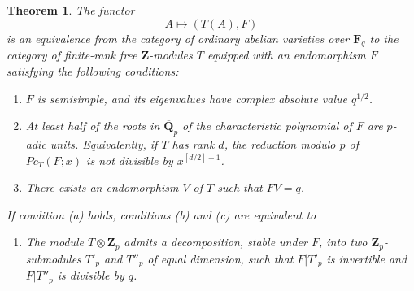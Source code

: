 \documentclass[10pt]{amsart}
\theoremstyle{plain}
\newtheorem{theorem}{Theorem}
\theoremstyle{remark}
\begin{document}
\begin{theorem}
The functor
\[
A\longmapsto (T(A),F)
\]
is an equivalence from the category of ordinary abelian varieties over $\mathbf F_q$ to the category of finite-rank free $\mathbf Z$-modules $T$ equipped with an endomorphism $F$ satisfying the following conditions:
\begin{enumerate}
\item[(a)] $F$ is semisimple, and its eigenvalues have complex absolute value $q^{1/2}$.
\item[(b)] At least half of the roots in $\overline{\mathbf Q}_p$ of the characteristic polynomial of $F$ are $p$-adic units. Equivalently, if $T$ has rank $d$, the reduction modulo $p$ of $Pc_T(F;x)$ is not divisible by $x^{[d/2]+1}$.
\item[(c)] There exists an endomorphism $V$ of $T$ such that $FV=q$.
\end{enumerate}
If condition (a) holds, conditions (b) and (c) are equivalent to
\begin{enumerate}
\item[(d)] The module $T\otimes \mathbf Z_p$ admits a decomposition, stable under $F$, into two $\mathbf Z_p$-submodules $T'_p$ and $T''_p$ of equal dimension, such that $F|T'_p$ is invertible and $F|T''_p$ is divisible by $q$.
\end{enumerate}
\end{theorem}
\end{document}
